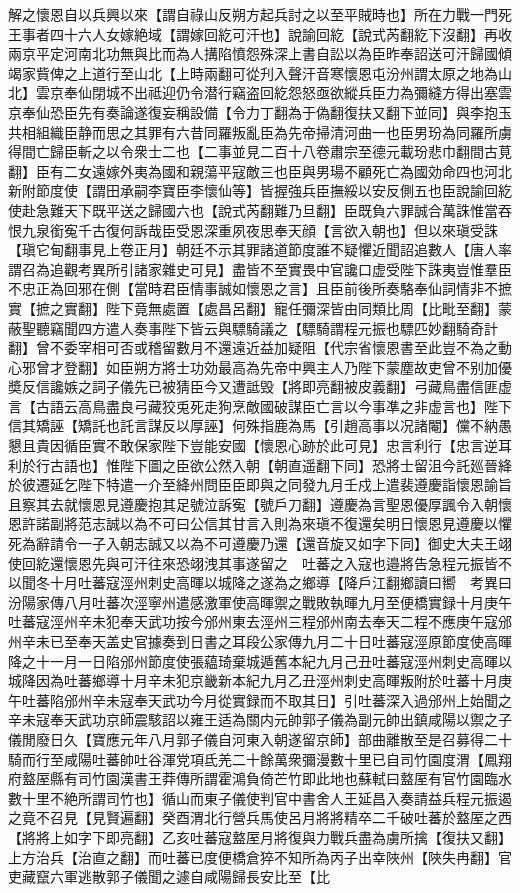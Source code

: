 解之懷恩自以兵興以來【謂自祿山反朔方起兵討之以至平賊時也】所在力戰一門死王事者四十六人女嫁絶域【謂嫁回紇可汗也】說諭回紇【說式芮翻紇下沒翻】再收兩京平定河南北功無與比而為人搆陷憤怨殊深上書自訟以為臣昨奉詔送可汗歸國傾竭家貲俾之上道行至山北【上時兩翻可從刋入聲汗音寒懷恩屯汾州謂太原之地為山北】雲京奉仙閉城不出祗迎仍令潜行竊盗回紇怨怒亟欲縱兵臣力為彌縫方得出塞雲京奉仙恐臣先有奏論遂復妄稱設備【令力丁翻為于偽翻復扶又翻下並同】與李抱玉共相組織臣静而思之其罪有六昔同羅叛亂臣為先帝掃清河曲一也臣男玢為同羅所虜得間亡歸臣斬之以令衆士二也【二事並見二百十八卷肅宗至德元載玢悲巾翻間古莧翻】臣有二女遠嫁外夷為國和親蕩平寇敵三也臣與男瑒不顧死亡為國効命四也河北新附節度使【謂田承嗣李寶臣李懷仙等】皆握強兵臣撫綏以安反側五也臣說諭回紇使赴急難天下既平送之歸國六也【說式芮翻難乃旦翻】臣既負六罪誠合萬誅惟當吞恨九泉銜寃千古復何訴哉臣受恩深重夙夜思奉天顔【言欲入朝也】但以來瑱受誅【瑱它甸翻事見上卷正月】朝廷不示其罪諸道節度誰不疑懼近聞詔追數人【唐人率謂召為追觀考異所引諸家雜史可見】盡皆不至實畏中官讒口虚受陛下誅夷豈惟羣臣不忠正為回邪在側【當時君臣情事誠如懷恩之言】且臣前後所奏駱奉仙詞情非不摭實【摭之實翻】陛下竟無處置【處昌呂翻】寵任彌深皆由同類比周【比毗至翻】蒙蔽聖聽竊聞四方遣人奏事陛下皆云與驃騎議之【驃騎謂程元振也驃匹妙翻騎奇計翻】曾不委宰相可否或稽留數月不還遠近益加疑阻【代宗省懷恩書至此豈不為之動心邪曾才登翻】如臣朔方將士功効最高為先帝中興主人乃陛下蒙塵故吏曾不别加優奬反信讒嫉之詞子儀先已被猜臣今又遭詆毁【將即亮翻被皮義翻】弓藏鳥盡信匪虚言【古語云高鳥盡良弓藏狡兎死走狗烹敵國破謀臣亡言以今事凖之非虚言也】陛下信其矯誣【矯託也託言謀反以厚誣】何殊指鹿為馬【引趙高事以况諸閹】儻不納愚懇且貴因循臣實不敢保家陛下豈能安國【懷恩心跡於此可見】忠言利行【忠言逆耳利於行古語也】惟陛下圖之臣欲公然入朝【朝直遥翻下同】恐將士留沮今託廵晉絳於彼遷延乞陛下特遣一介至絳州問臣臣即與之同發九月壬戍上遣裴遵慶詣懷恩諭旨且察其去就懷恩見遵慶抱其足號泣訴寃【號戶刀翻】遵慶為言聖恩優厚諷令入朝懷恩許諾副將范志誠以為不可曰公信其甘言入則為來瑱不復還矣明日懷恩見遵慶以懼死為辭請令一子入朝志誠又以為不可遵慶乃還【還音旋又如字下同】御史大夫王翊使回紇還懷恩先與可汗往來恐翊洩其事遂留之　吐蕃之入寇也邉將告急程元振皆不以聞冬十月吐蕃寇涇州刺史高暉以城降之遂為之鄉導【降戶江翻鄉讀曰嚮　考異曰汾陽家傳八月吐蕃次涇寧州遣感激軍使高暉禦之戰敗執暉九月至便橋實録十月庚午吐蕃寇涇州辛未犯奉天武功按今邠州東去涇州三程邠州南去奉天二程不應庚午寇邠州辛未已至奉天盖史官據奏到日書之耳段公家傳九月二十日吐蕃寇涇原節度使高暉降之十一月一日陷邠州節度使張藴琦棄城遁舊本紀九月己丑吐蕃寇涇州刺史高暉以城降因為吐蕃鄉導十月辛未犯京畿新本紀九月乙丑涇州刺史高暉叛附於吐蕃十月庚午吐蕃陷邠州辛未寇奉天武功今月從實録而不取其日】引吐蕃深入過邠州上始聞之辛未寇奉天武功京師震駭詔以雍王适為關内元帥郭子儀為副元帥出鎮咸陽以禦之子儀閒廢日久【寶應元年八月郭子儀自河東入朝遂留京師】部曲離散至是召募得二十騎而行至咸陽吐蕃帥吐谷渾党項氐羌二十餘萬衆彌漫數十里已自司竹園度渭【鳳翔府盩厔縣有司竹園漢書王莽傳所謂霍鴻負倚芒竹即此地也蘇軾曰盩厔有官竹園臨水數十里不絶所謂司竹也】循山而東子儀使判官中書舍人王延昌入奏請益兵程元振遏之竟不召見【見賢遍翻】癸酉渭北行營兵馬使呂月將將精卒二千破吐蕃於盩厔之西【將將上如字下即亮翻】乙亥吐蕃寇盩厔月將復與力戰兵盡為虜所擒【復扶又翻】上方治兵【治直之翻】而吐蕃已度便橋倉猝不知所為丙子出幸陜州【陜失冉翻】官吏藏竄六軍逃散郭子儀聞之遽自咸陽歸長安比至【比